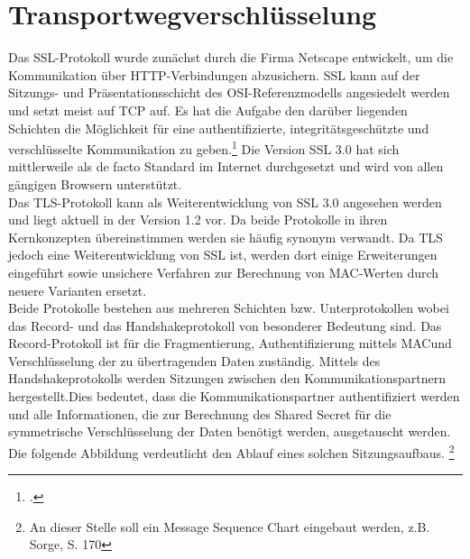 \chapter{Transportwegverschlüsselung}
Das \ac{SSL}-Protokoll wurde zunächst durch die Firma Netscape entwickelt, um die Kommunikation über \ac{HTTP}-Verbindungen abzusichern.\cite[S. 796]{Eckert2013} \ac{SSL} kann auf der Sitzungs- und Präsentationsschicht des \ac{OSI}-Referenzmodells angesiedelt werden und setzt meist auf \ac{TCP} auf. Es hat die Aufgabe den darüber liegenden Schichten die Möglichkeit für eine authentifizierte, integritätsgeschützte und verschlüsselte Kommunikation zu geben.\footcite[S. 799 ff.]{Eckert2013}
Die Version \ac{SSL} 3.0 hat sich mittlerweile als de facto Standard im Internet durchgesetzt und wird von allen gängigen Browsern unterstützt.\\
Das \ac{TLS}-Protokoll kann als Weiterentwicklung von \ac{SSL}  3.0 angesehen werden und liegt aktuell in der Version 1.2 vor. Da beide Protokolle in ihren Kernkonzepten übereinstimmen werden sie häufig synonym verwandt. Da \ac{TLS} jedoch eine Weiterentwicklung von \ac{SSL} ist, werden dort einige Erweiterungen eingeführt sowie unsichere Verfahren zur Berechnung von \ac{MAC}-Werten durch neuere Varianten ersetzt.\\
Beide Protokolle bestehen aus mehreren Schichten bzw. Unterprotokollen wobei das Record- und das Handshakeprotokoll von besonderer Bedeutung sind. Das Record-Protokoll ist für die Fragmentierung, Authentifizierung mittels \ac{MAC}und Verschlüsselung der zu übertragenden Daten zuständig. Mittels des Handshakeprotokolls werden Sitzungen zwischen den Kommunikationspartnern hergestellt.Dies bedeutet, dass die Kommunikationspartner authentifiziert werden und alle Informationen, die zur Berechnung des Shared Secret für die symmetrische Verschlüsselung der Daten benötigt werden, ausgetauscht werden. Die folgende Abbildung verdeutlicht den Ablauf eines solchen Sitzungsaufbaus. \footnote{An dieser Stelle soll ein Message Sequence Chart eingebaut werden, z.B. Sorge, S. 170}\\
	